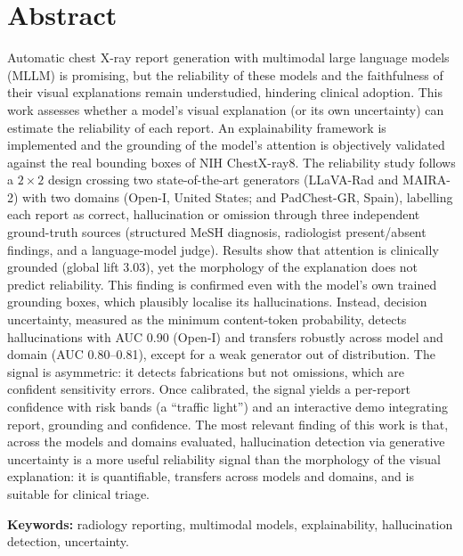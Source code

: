 \chapter*{Abstract}

Automatic chest X-ray report generation with multimodal large language models (MLLM) is promising, but
the reliability of these models and the faithfulness of their visual explanations remain understudied,
hindering clinical adoption. This work assesses whether a model's visual explanation (or its own
uncertainty) can estimate the reliability of each report. An explainability framework is implemented
and the grounding of the model's attention is objectively validated against the real bounding boxes of
NIH ChestX-ray8. The reliability study follows a \(2\times2\) design crossing two state-of-the-art
generators (LLaVA-Rad and MAIRA-2) with two domains (Open-I, United States; and PadChest-GR, Spain),
labelling each report as correct, hallucination or omission through three independent ground-truth
sources (structured MeSH diagnosis, radiologist present/absent findings, and a language-model judge).
Results show that attention is clinically grounded (global lift 3.03), yet the morphology of the
explanation does not predict reliability. This finding is confirmed even with the model's own trained
grounding boxes, which plausibly localise its hallucinations. Instead, decision uncertainty, measured
as the minimum content-token probability, detects hallucinations with AUC 0.90 (Open-I) and transfers
robustly across model and domain (AUC 0.80--0.81), except for a weak generator out of distribution.
The signal is asymmetric: it detects fabrications but not omissions, which are confident sensitivity
errors. Once calibrated, the signal yields a per-report confidence with risk bands (a ``traffic
light'') and an interactive demo integrating report, grounding and confidence. The most relevant
finding of this work is that, across the models and domains evaluated, hallucination detection
via generative uncertainty is a more useful reliability signal than the morphology of the visual
explanation: it is quantifiable, transfers across models and domains, and is suitable for clinical
triage.

\vspace{0.4cm}\noindent\textbf{Keywords:} radiology reporting, multimodal models, explainability,
hallucination detection, uncertainty.

